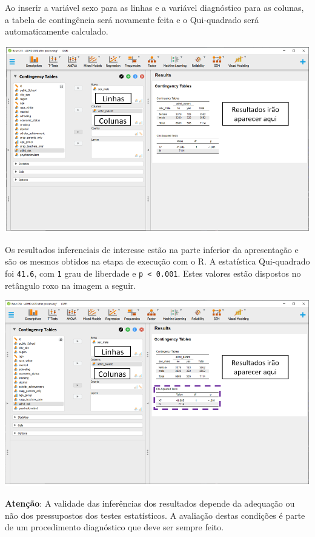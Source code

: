 \documentclass[
]{book}
\begin{document}
Ao inserir a variável sexo para as linhas e a variável diagnóstico para
as colunas, a tabela de contingência será novamente feita e o
Qui-quadrado será automaticamente calculado.

\includegraphics{./img/cap_x2_resultados.png}

Os resultados inferenciais de interesse estão na parte inferior da
apresentação e são os mesmos obtidos na etapa de execução com o R. A
estatística Qui-quadrado foi \texttt{41.6}, com \texttt{1} grau de
liberdade e \texttt{p\ \textless{}\ 0.001}. Estes valores estão
dispostos no retângulo roxo na imagem a seguir.

\includegraphics{./img/cap_x2_resultados2.png}

\begin{warning}

\textbf{Atenção}: A validade das inferências dos resultados depende da
adequação ou não dos pressupostos dos testes estatísticos. A avaliação
destas condições é parte de um procedimento diagnóstico que deve ser
sempre feito.

\end{warning}
\end{document}
